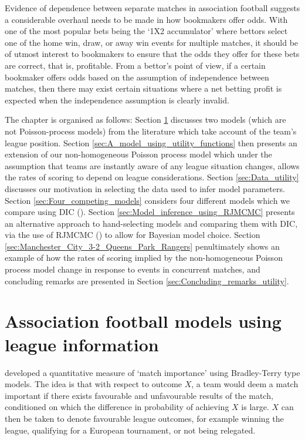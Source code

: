 Evidence of dependence between separate matches in association football suggests a considerable overhaul needs to be
made in how bookmakers offer odds. With one of the most popular bets being the `1X2 accumulator' where bettors select
one of the home win, draw, or away win events for multiple matches, it should be of utmost interest to bookmakers to
ensure that the odds they offer for these bets are correct, that is, profitable. From a bettor's point of view, if a
certain bookmaker offers odds based on the assumption of independence between matches, then there may exist certain
situations where a net betting profit is expected when the independence assumption is clearly invalid.

The chapter is organised as follows: Section \ref{sec:Association_football_models_using_league_information} discusses
two models (which are not Poisson-process models) from the literature which take account of the team's league position.
Section \ref{sec:A_model_using_utility_functions} then presents an extension of our non-homogeneous Poisson process model
which under the assumption that teams are instantly aware of any league situation changes, allows the rates of scoring
to depend on league considerations. Section \ref{sec:Data_utility} discusses our motivation in selecting the data used
to infer model parameters. Section \ref{sec:Four_competing_models} considers four different models which we compare
using \gls{DIC} (\cite{spiegelhalter2002}). Section \ref{sec:Model_inference_using_RJMCMC} presents an alternative
approach to hand-selecting models and comparing them with \gls{DIC}, via the use of \gls{RJMCMC} (\cite{green1995}) to
allow for Bayesian model choice. Section \ref{sec:Manchester_City_3-2_Queens_Park_Rangers} penultimately shows an
example of how the rates of scoring implied by the non-homogeneous Poisson process model change in response to events in
concurrent matches, and concluding remarks are presented in Section \ref{sec:Concluding_remarks_utility}.

\section{Association football models using league information}
\label{sec:Association_football_models_using_league_information}

\cite{scarf2008} developed a quantitative measure of `match importance' using Bradley-Terry type models. The idea is
that with respect to outcome \(X\), a team would deem a match important if there exists favourable and unfavourable
results of the match, conditioned on which the difference in probability of achieving \(X\) is large. \(X\) can then be
taken to denote favourable league outcomes, for example winning the league, qualifying for a European tournament, or not
being relegated.

